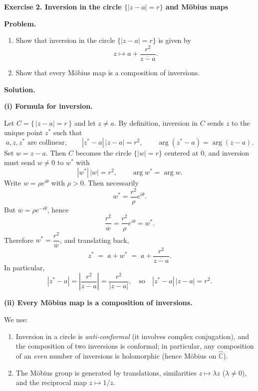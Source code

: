 \begin{solution}
\par\medskip\noindent\textbf{\textbf{Exercise 2. Inversion in the circle $\{|z-a|=r\}$ and M\"{o}bius maps}}\par\smallskip


\par\medskip\noindent\textbf{\textbf{Problem.}}\par\smallskip

\begin{enumerate}
	\item Show that inversion in the circle $\{|z-a|=r\}$ is given by
	\[
	z \longmapsto a+\frac{r^{2}}{\overline{z-a}}.
	\]
	\item Show that every M\"{o}bius map is a composition of inversions.
\end{enumerate}

\par\medskip\noindent\textbf{\textbf{Solution.}}\par\smallskip


\par\medskip\noindent\textbf{\textbf{(i) Formula for inversion.}}\par\smallskip

Let $C=\{\,|z-a|=r\,\}$ and let $z\neq a$. By definition, inversion in $C$ sends $z$ to the unique point $z^{*}$ such that
\[
a,z,z^{*} \text{ are collinear},\qquad |z^{*}-a|\,|z-a|=r^2,
\qquad \arg(z^{*}-a)=\arg(z-a).
\]
Set $w=z-a$. Then $C$ becomes the circle $\{|w|=r\}$ centered at $0$, and inversion must send $w\neq 0$ to $w^{*}$ with
\[
|w^{*}|\,|w|=r^2,\qquad \arg w^{*}=\arg w.
\]
Write $w=\rho e^{i\theta}$ with $\rho>0$. Then necessarily
\[
w^{*}=\frac{r^2}{\rho}e^{i\theta}.
\]
But $\overline{w}=\rho e^{-i\theta}$, hence
\[
\frac{r^2}{\overline{w}}=\frac{r^2}{\rho}e^{i\theta}=w^{*}.
\]
Therefore $w^{*}=\dfrac{r^2}{\overline{w}}$, and translating back,
\[
z^{*} \;=\; a+w^{*} \;=\; a+\frac{r^2}{\overline{z-a}}.
\]
In particular,
\[
|z^{*}-a|=\left|\frac{r^2}{\overline{z-a}}\right|=\frac{r^2}{|z-a|},
\quad\text{so}\quad
|z^{*}-a|\,|z-a|=r^2.
\]

\par\medskip\noindent\textbf{\textbf{(ii) Every M\"{o}bius map is a composition of inversions.}}\par\smallskip

We use:
\begin{enumerate}
	\item Inversion in a circle is \emph{anti-conformal} (it involves complex conjugation), and the composition of two inversions is conformal; in particular, any composition of an \emph{even} number of inversions is holomorphic (hence M\"{o}bius on $\widehat{\mathbb C}$).
	\item The M\"{o}bius group is generated by translations, similarities $z\mapsto \lambda z$ ($\lambda\neq 0$), and the reciprocal map $z\mapsto 1/z$.
\end{enumerate}
\end{solution}

